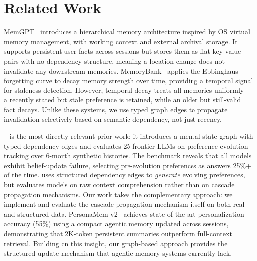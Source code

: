 \section{Related Work}
\label{sec:related}

MemGPT~\cite{packer2024memgpt} introduces a hierarchical memory architecture inspired by OS virtual memory management, with working context and external archival storage. It supports persistent user facts across sessions but stores them as flat key-value pairs with no dependency structure, meaning a location change does not invalidate any downstream memories. MemoryBank~\cite{zhong2023memorybank} applies the Ebbinghaus forgetting curve to decay memory strength over time, providing a temporal signal for staleness detection. However, temporal decay treats all memories uniformly — a recently stated but stale preference is retained, while an older but still-valid fact decays. Unlike these systems, we use typed graph edges to propagate invalidation selectively based on semantic dependency, not just recency.

\horizonbench~\cite{li2026horizonbench} is the most directly relevant prior work: it introduces a mental state graph with typed dependency edges and evaluates 25 frontier LLMs on preference evolution tracking over 6-month synthetic histories. The benchmark reveals that all models exhibit belief-update failure, selecting pre-evolution preferences as answers 25\%+ of the time. \horizonbench uses structured dependency edges to \textit{generate} evolving preferences, but evaluates models on raw context comprehension rather than on cascade propagation mechanisms. Our work takes the complementary approach: we implement and evaluate the cascade propagation mechanism itself on both real and structured data. PersonaMem-v2~\cite{jiang2025personamem} achieves state-of-the-art personalization accuracy (55\%) using a compact agentic memory updated across sessions, demonstrating that 2K-token persistent summaries outperform full-context retrieval. Building on this insight, our graph-based approach provides the structured update mechanism that agentic memory systems currently lack.

